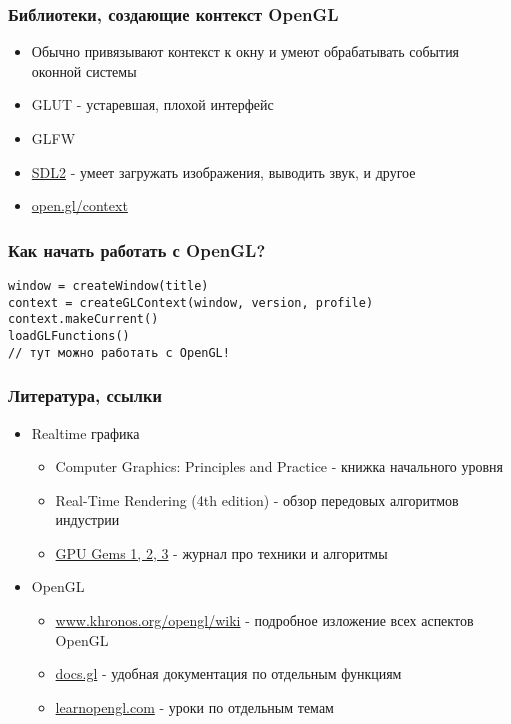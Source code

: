 \documentclass{beamer}
\begin{document}
\begin{frame}
\frametitle{Библиотеки, создающие контекст OpenGL}
\begin{itemize}
\item Обычно привязывают контекст к окну и умеют обрабатывать события оконной системы
\item GLUT - устаревшая, плохой интерфейс
\item GLFW
\item {\color{blue}\underline{SDL2}} - умеет загружать изображения, выводить звук, и другое
\item \url{open.gl/context}
\end{itemize}
\end{frame}

\begin{frame}[fragile]
\frametitle{Как начать работать с OpenGL?}
\begin{verbatim}
window = createWindow(title)
context = createGLContext(window, version, profile)
context.makeCurrent()
loadGLFunctions()
// тут можно работать с OpenGL!
\end{verbatim}
\end{frame}

\begin{frame}
\frametitle{Литература, ссылки}
\begin{itemize}
\item Realtime графика
\begin{itemize}
\item Computer Graphics: Principles and Practice - книжка начального уровня
\item Real-Time Rendering (4th edition) - обзор передовых алгоритмов индустрии
\item \href{developer.nvidia.com/gpugems}{GPU Gems 1, 2, 3} - журнал про техники и алгоритмы
\end{itemize}
\item OpenGL
\begin{itemize}
\item \url{www.khronos.org/opengl/wiki} - подробное изложение всех аспектов OpenGL
\item \url{docs.gl} - удобная документация по отдельным функциям
\item \url{learnopengl.com} - уроки по отдельным темам
\end{itemize}
\end{itemize}
\end{frame}
\end{document}
